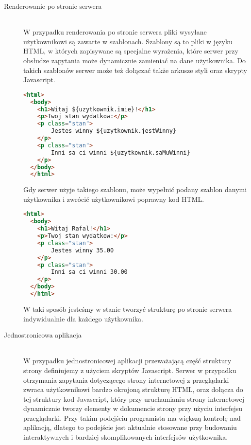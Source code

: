 \begin{description}
  \item[Renderowanie po stronie serwera] \hfill \\ W przypadku renderowania po stronie serwera pliki wysyłane użytkownikowi są zawarte w szablonach. Szablony są to pliki w języku HTML, w których zapisywane są specjalne wyrażenia, które serwer przy obsłudze zapytania może dynamicznie zamieniać na dane użytkownika. Do takich szablonów serwer może też dołączać także arkusze styli oraz skrypty Javascript.
  \begin{lstlisting}[language=HTML, caption=Przykład szablonu w Freemaker]
  <html>
  <body>
    <h1>Witaj ${uzytkownik.imie}!</h1>
    <p>Twoj stan wydatkow:</p>
    <p class="stan">
        Jestes winny ${uzytkownik.jestWinny}
    </p>
    <p class="stan">
        Inni sa ci winni ${uzytkownik.saMuWinni}
    </p>
  </body>
  </html>
  \end{lstlisting}

  Gdy serwer użyje takiego szablonu, może wypełnić podany szablon danymi użytkownika i zwrócić użytkownikowi poprawny kod HTML.

  \begin{lstlisting}[language=HTML, caption=Przykład wyniku zwróconego z szablonu]
  <html>
  <body>
    <h1>Witaj Rafal!</h1>
    <p>Twoj stan wydatkow:</p>
    <p class="stan">
        Jestes winny 35.00
    </p>
    <p class="stan">
        Inni sa ci winni 30.00
    </p>
  </body>
  </html>
  \end{lstlisting}
  W taki sposób jesteśmy w stanie tworzyć strukturę po stronie serwera indywidualnie dla każdego użytkownika.
  \vspace{0.4cm}

  \item[Jednostronicowa aplikacja] \hfill \\ W przypadku jednostronicowej aplikacji przeważającą część struktury strony definiujemy z użyciem skryptów Javascript. Serwer w przypadku otrzymania zapytania dotyczącego strony internetowej z przeglądarki zwraca użytkownikowi bardzo okrojoną strukturę HTML, oraz dołącza do tej struktury kod Javascript, który przy uruchamianiu strony internetowej dynamicznie tworzy elementy w dokumencie strony przy użyciu interfejsu przeglądarki. Przy takim podejściu programista ma większą kontrolę nad aplikacją, dlatego to podejście jest aktualnie stosowane przy budowaniu interaktywnych i bardziej skomplikowanych interfejsów użytkownika.


\end{description}
